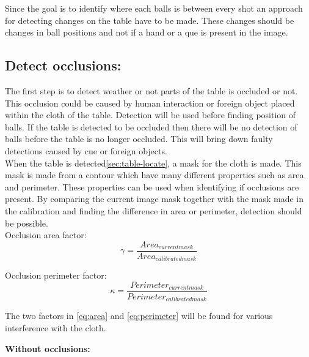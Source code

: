 Since the goal is to identify where each balls is between every shot an approach for detecting changes on the table have to be made. These changes should be changes in ball positions and not if a hand or a que is present in the image.\\

\subsection{Detect occlusions:}
The first step is to detect weather or not parts of the table is occluded or not. This occlusion could be caused by human interaction or foreign object placed within the cloth of the table. Detection will be used before finding position of balls. If the table is detected to be occluded then there will be no detection of balls before the table is no longer occluded. This will bring down faulty detections caused by cue or foreign objects.\\

When the table is detected\ref{sec:table-locate}, a mask for the cloth is made. This mask is made from a contour which have many different properties such as area and perimeter. These properties can be used when identifying if occlusions are present. By comparing the current image mask together with the mask made in the calibration and finding the difference in area or perimeter, detection should be possible.\\

Occlusion area factor:
\begin{equation}
\gamma = \frac{Area_{current mask}}{Area_{calibrated mask}}
\label{eq:area}
\end{equation}

Occlusion perimeter factor:
\begin{equation}
\kappa = \frac{Perimeter_{current mask}}{Perimeter_{calibrated mask}}
\label{eq:perimeter}
\end{equation}

The two factors in \ref{eq:area} and \ref{eq:perimeter} will be found for various interference with the cloth.

\textbf{Without occlusions:}\\

\begin{figure}[H]
\centering
{}
\\
\end{figure}

